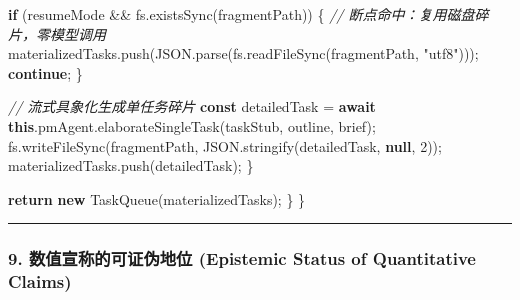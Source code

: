 \documentclass[
]{ctexart}
\newenvironment{Shaded}{}{}
\newcommand{\AttributeTok}[1]{\textcolor[rgb]{0.49,0.56,0.16}{#1}}
\newcommand{\BuiltInTok}[1]{\textcolor[rgb]{0.00,0.50,0.00}{#1}}
\newcommand{\CommentTok}[1]{\textcolor[rgb]{0.38,0.63,0.69}{\textit{#1}}}
\newcommand{\ControlFlowTok}[1]{\textcolor[rgb]{0.00,0.44,0.13}{\textbf{#1}}}
\newcommand{\DecValTok}[1]{\textcolor[rgb]{0.25,0.63,0.44}{#1}}
\newcommand{\FunctionTok}[1]{\textcolor[rgb]{0.02,0.16,0.49}{#1}}
\newcommand{\KeywordTok}[1]{\textcolor[rgb]{0.00,0.44,0.13}{\textbf{#1}}}
\newcommand{\NormalTok}[1]{#1}
\newcommand{\OperatorTok}[1]{\textcolor[rgb]{0.40,0.40,0.40}{#1}}
\newcommand{\StringTok}[1]{\textcolor[rgb]{0.25,0.44,0.63}{#1}}
\renewcommand{\_}{\discretionary{}{}{\textunderscore}}
\begin{document}
\begin{Shaded}
\begin{Highlighting}[]
      \ControlFlowTok{if}\NormalTok{ (resumeMode }\OperatorTok{\&\&}\NormalTok{ fs}\OperatorTok{.}\FunctionTok{existsSync}\NormalTok{(fragmentPath)) \{}
        \CommentTok{// 断点命中：复用磁盘碎片，零模型调用}
\NormalTok{        materializedTasks}\OperatorTok{.}\FunctionTok{push}\NormalTok{(}\BuiltInTok{JSON}\OperatorTok{.}\FunctionTok{parse}\NormalTok{(fs}\OperatorTok{.}\FunctionTok{readFileSync}\NormalTok{(fragmentPath}\OperatorTok{,} \StringTok{"utf8"}\NormalTok{)))}\OperatorTok{;}
        \ControlFlowTok{continue}\OperatorTok{;}
\NormalTok{      \}}

      \CommentTok{// 流式具象化生成单任务碎片}
      \KeywordTok{const}\NormalTok{ detailedTask }\OperatorTok{=} \ControlFlowTok{await} \KeywordTok{this}\OperatorTok{.}\AttributeTok{pmAgent}\OperatorTok{.}\FunctionTok{elaborateSingleTask}\NormalTok{(taskStub}\OperatorTok{,}\NormalTok{ outline}\OperatorTok{,}\NormalTok{ brief)}\OperatorTok{;}
\NormalTok{      fs}\OperatorTok{.}\FunctionTok{writeFileSync}\NormalTok{(fragmentPath}\OperatorTok{,} \BuiltInTok{JSON}\OperatorTok{.}\FunctionTok{stringify}\NormalTok{(detailedTask}\OperatorTok{,} \KeywordTok{null}\OperatorTok{,} \DecValTok{2}\NormalTok{))}\OperatorTok{;}
\NormalTok{      materializedTasks}\OperatorTok{.}\FunctionTok{push}\NormalTok{(detailedTask)}\OperatorTok{;}
\NormalTok{    \}}

    \ControlFlowTok{return} \KeywordTok{new} \FunctionTok{TaskQueue}\NormalTok{(materializedTasks)}\OperatorTok{;}
\NormalTok{  \}}
\NormalTok{\}}
\end{Highlighting}
\end{Shaded}

\begin{center}\rule{0.5\linewidth}{0.5pt}\end{center}

\subsubsection{9. 数值宣称的可证伪地位 (Epistemic Status of Quantitative
Claims)}\label{ux6570ux503cux5ba3ux79f0ux7684ux53efux8bc1ux4f2aux5730ux4f4d-epistemic-status-of-quantitative-claims-1}
\end{document}
